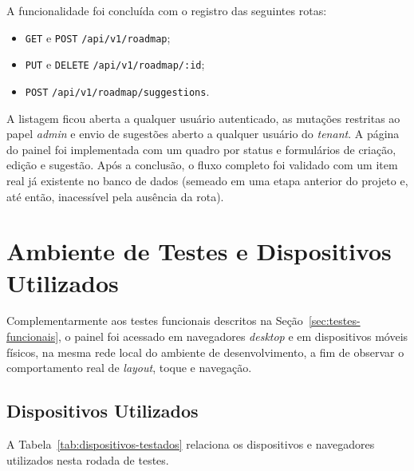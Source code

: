 A funcionalidade foi concluída com o registro das seguintes rotas:

\begin{itemize}
  \item \texttt{GET} e \texttt{POST} \texttt{/\allowbreak{}api/\allowbreak{}v1/\allowbreak{}roadmap};
  \item \texttt{PUT} e \texttt{DELETE} \texttt{/\allowbreak{}api/\allowbreak{}v1/\allowbreak{}roadmap/\allowbreak{}:id};
  \item \texttt{POST} \texttt{/\allowbreak{}api/\allowbreak{}v1/\allowbreak{}roadmap/\allowbreak{}suggestions}.
\end{itemize}

A listagem ficou aberta a qualquer usuário autenticado, as mutações restritas ao papel \textit{admin} e envio de sugestões aberto a qualquer usuário do \textit{tenant}. A página do painel foi implementada com um quadro por status e formulários de criação, edição e sugestão. Após a conclusão, o fluxo completo foi validado com um item real já existente no banco de dados (semeado em uma etapa anterior do projeto e, até então, inacessível pela ausência da rota).

\section{Ambiente de Testes e Dispositivos Utilizados}

Complementarmente aos testes funcionais descritos na Seção~\ref{sec:testes-funcionais}, o painel foi acessado em navegadores \textit{desktop} e em dispositivos móveis físicos, na mesma rede local do ambiente de desenvolvimento, a fim de observar o comportamento real de \textit{layout}, toque e navegação.

\subsection{Dispositivos Utilizados}

A Tabela~\ref{tab:dispositivos-testados} relaciona os dispositivos e navegadores utilizados nesta rodada de testes.

